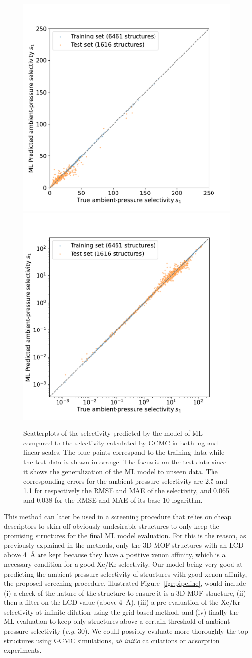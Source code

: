 \documentclass[main]{subfiles}
\begin{document}
\begin{figure}[ht]
  \centering
    \includegraphics[width=0.48\linewidth]{figures/4-ml/SI_figure/Scatterplot_S1_prediction.pdf}
    \includegraphics[width=0.48\linewidth]{figures/4-ml/SI_figure/Scatterplot_S1_prediction_logscale.pdf}
    \caption{Scatterplots of the selectivity predicted by the model of ML compared to the selectivity calculated by GCMC in both log and linear scales. The blue points correspond to the training data while the test data is shown in orange. The focus is on the test data since it shows the generalization of the ML model to unseen data. The corresponding errors for the ambient-pressure selectivity are 2.5 and 1.1 for respectively the RMSE and MAE of the selectivity, and 0.065 and 0.038 for the RMSE and MAE of its base-10 logarithm. }\label{fgr:S1_prediction}
  \end{figure}

This method can later be used in a screening procedure that relies on cheap descriptors to skim off obviously undesirable structures to only keep the promising structures for the final ML model evaluation. For this is the reason, as previously explained in the methods, only the 3D MOF structures with an LCD above \SI{4}{\angstrom} are kept because they have a positive xenon affinity, which is a necessary condition for a good Xe/Kr selectivity. Our model being very good at predicting the ambient pressure selectivity of structures with good xenon affinity, the proposed screening procedure, illustrated Figure~\ref{fgr:pipeline}, would include (i) a check of the nature of the structure to ensure it is a 3D MOF structure, (ii) then a filter on the LCD value (above \SI{4}{\angstrom}), (iii) a pre-evaluation of the Xe/Kr selectivity at infinite dilution using the grid-based method, and (iv) finally the ML evaluation to keep only structures above a certain threshold of ambient-pressure selectivity (\emph{e.g.} 30). We could possibly evaluate more thoroughly the top structures using GCMC simulations, \emph{ab initio} calculations or adsorption experiments.
\end{document}
